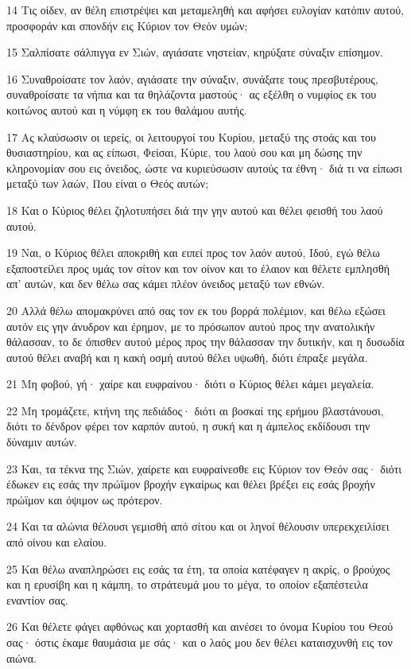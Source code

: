 \par 14 Τις οίδεν, αν θέλη επιστρέψει και μεταμεληθή και αφήσει ευλογίαν κατόπιν αυτού, προσφοράν και σπονδήν εις Κύριον τον Θεόν υμών;
\par 15 Σαλπίσατε σάλπιγγα εν Σιών, αγιάσατε νηστείαν, κηρύξατε σύναξιν επίσημον.
\par 16 Συναθροίσατε τον λαόν, αγιάσατε την σύναξιν, συνάξατε τους πρεσβυτέρους, συναθροίσατε τα νήπια και τα θηλάζοντα μαστούς· ας εξέλθη ο νυμφίος εκ του κοιτώνος αυτού και η νύμφη εκ του θαλάμου αυτής.
\par 17 Ας κλαύσωσιν οι ιερείς, οι λειτουργοί του Κυρίου, μεταξύ της στοάς και του θυσιαστηρίου, και ας είπωσι, Φείσαι, Κύριε, του λαού σου και μη δώσης την κληρονομίαν σου εις όνειδος, ώστε να κυριεύσωσιν αυτούς τα έθνη· διά τι να είπωσι μεταξύ των λαών, Που είναι ο Θεός αυτών;
\par 18 Και ο Κύριος θέλει ζηλοτυπήσει διά την γην αυτού και θέλει φεισθή του λαού αυτού.
\par 19 Ναι, ο Κύριος θέλει αποκριθή και ειπεί προς τον λαόν αυτού, Ιδού, εγώ θέλω εξαποστείλει προς υμάς τον σίτον και τον οίνον και το έλαιον και θέλετε εμπλησθή απ' αυτών, και δεν θέλω σας κάμει πλέον όνειδος μεταξύ των εθνών.
\par 20 Αλλά θέλω απομακρύνει από σας τον εκ του βορρά πολέμιον, και θέλω εξώσει αυτόν εις γην άνυδρον και έρημον, με το πρόσωπον αυτού προς την ανατολικήν θάλασσαν, το δε όπισθεν αυτού μέρος προς την θάλασσαν την δυτικήν, και η δυσωδία αυτού θέλει αναβή και η κακή οσμή αυτού θέλει υψωθή, διότι έπραξε μεγάλα.
\par 21 Μη φοβού, γή· χαίρε και ευφραίνου· διότι ο Κύριος θέλει κάμει μεγαλεία.
\par 22 Μη τρομάζετε, κτήνη της πεδιάδος· διότι αι βοσκαί της ερήμου βλαστάνουσι, διότι το δένδρον φέρει τον καρπόν αυτού, η συκή και η άμπελος εκδίδουσι την δύναμιν αυτών.
\par 23 Και, τα τέκνα της Σιών, χαίρετε και ευφραίνεσθε εις Κύριον τον Θεόν σας· διότι έδωκεν εις εσάς την πρώϊμον βροχήν εγκαίρως και θέλει βρέξει εις εσάς βροχήν πρώϊμον και όψιμον ως πρότερον.
\par 24 Και τα αλώνια θέλουσι γεμισθή από σίτου και οι ληνοί θέλουσιν υπερεκχειλίσει από οίνου και ελαίου.
\par 25 Και θέλω αναπληρώσει εις εσάς τα έτη, τα οποία κατέφαγεν η ακρίς, ο βρούχος και η ερυσίβη και η κάμπη, το στράτευμά μου το μέγα, το οποίον εξαπέστειλα εναντίον σας.
\par 26 Και θέλετε φάγει αφθόνως και χορτασθή και αινέσει το όνομα Κυρίου του Θεού σας· όστις έκαμε θαυμάσια με σάς· και ο λαός μου δεν θέλει καταισχυνθή εις τον αιώνα.
